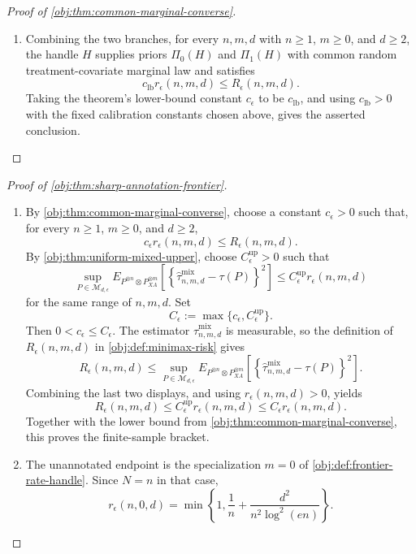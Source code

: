 \begin{proof}[Proof of \cref{obj:thm:common-marginal-converse}]
\begin{enumerate}
\item Combining the two branches, for every \(n,m,d\) with \(n\ge1\), \(m\ge0\), and \(d\ge2\), the handle \(H\) supplies priors \(\Pi_0(H)\) and \(\Pi_1(H)\) with common random treatment-covariate marginal law and satisfies
\[
c_{\mathrm{lb}} r_\epsilon(n,m,d)\le R_\epsilon(n,m,d).
\]
Taking the theorem's lower-bound constant \(c_\epsilon\) to be \(c_{\mathrm{lb}}\), and using \(c_{\mathrm{lb}}>0\) with the fixed calibration constants chosen above, gives the asserted conclusion. %
\end{enumerate}
\end{proof}

\begin{proof}[Proof of \cref{obj:thm:sharp-annotation-frontier}]
\begin{enumerate}
\item By \cref{obj:thm:common-marginal-converse}, choose a constant \(c_\epsilon>0\) such that, for every \(n\ge1\), \(m\ge0\), and \(d\ge2\),
\[
c_\epsilon r_\epsilon(n,m,d)\le R_\epsilon(n,m,d).
\]
By \cref{obj:thm:uniform-mixed-upper}, choose \(C_\epsilon^{\mathrm{up}}>0\) such that
\[
\sup_{P\in\mathcal M_{d,\epsilon}}
E_{P^{\otimes n}\otimes P_{XA}^{\otimes m}}
\!\left[
\left\{\widehat\tau^{\mathrm{mix}}_{n,m,d}-\tau(P)\right\}^2
\right]
\le
C_\epsilon^{\mathrm{up}} r_\epsilon(n,m,d)
\]
for the same range of \(n,m,d\).  Set
\[
C_\epsilon:=\max\{c_\epsilon,C_\epsilon^{\mathrm{up}}\}.
\]
Then \(0<c_\epsilon\le C_\epsilon\).  The estimator
\(\widehat\tau^{\mathrm{mix}}_{n,m,d}\) is measurable, so the definition of
\(R_\epsilon(n,m,d)\) in \cref{obj:def:minimax-risk} gives
\[
R_\epsilon(n,m,d)
\le
\sup_{P\in\mathcal M_{d,\epsilon}}
E_{P^{\otimes n}\otimes P_{XA}^{\otimes m}}
\!\left[
\left\{\widehat\tau^{\mathrm{mix}}_{n,m,d}-\tau(P)\right\}^2
\right].
\]
Combining the last two displays, and using \(r_\epsilon(n,m,d)>0\), yields
\[
R_\epsilon(n,m,d)
\le
C_\epsilon^{\mathrm{up}} r_\epsilon(n,m,d)
\le
C_\epsilon r_\epsilon(n,m,d).
\]
Together with the lower bound from \cref{obj:thm:common-marginal-converse}, this proves the finite-sample bracket. %

\item The unannotated endpoint is the specialization \(m=0\) of \cref{obj:def:frontier-rate-handle}.  Since \(N=n\) in that case,
\[
r_\epsilon(n,0,d)
=
\min\!\left\{1,\frac1n+\frac{d^2}{n^2\log^2(en)}\right\}.
\]


\end{enumerate}
\end{proof}
